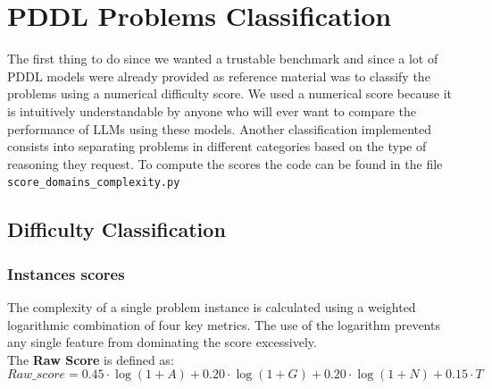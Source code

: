 \documentclass[a4paper]{article}
\begin{document}
\section{PDDL Problems Classification}
The first thing to do since we wanted a trustable benchmark and since a lot of PDDL models were already provided as reference material was to classify the problems 
using a numerical difficulty score. We used a numerical score because it is intuitively understandable by anyone who will ever want to compare the performance of 
LLMs using these models.
Another classification implemented consists into separating problems in different categories based on the type of reasoning they request.
To compute the scores the code can be found in the file \texttt{score\_domains\_complexity.py}

    \subsection{Difficulty Classification}
    \subsubsection{Instances scores}
    The complexity of a single problem instance is calculated using a weighted logarithmic combination of four key metrics. The use of the logarithm prevents any single feature from dominating the score excessively.\\

    The \textbf{Raw Score} is defined as:
    \begin{equation}
        Raw\_score = 0.45 \cdot \log(1 + A) + 0.20 \cdot \log(1 + G) + 0.20 \cdot \log(1 + N) + 0.15 \cdot T
    \end{equation}
\end{document}
